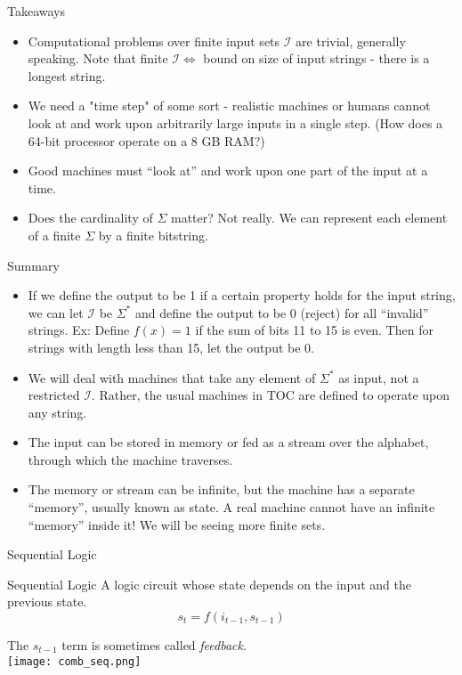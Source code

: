 \documentclass{beamer}
\begin{document}
\begin{frame}{Takeaways}
\begin{itemize}
    \item Computational problems over finite input sets \(\mathcal{I}\) are trivial, generally speaking. Note that finite \(\mathcal{I} \Leftrightarrow\) bound on size of input strings - there is a longest string.
    \pause
    \item We need a "time step" of some sort - realistic machines or humans cannot look at and work upon arbitrarily large inputs in a single step. (How does a 64-bit processor operate on a 8 GB RAM?) \pause
    \item Good machines must ``look at'' and work upon one part of the input at a time. \pause
    \item Does the cardinality of \(\Sigma\) matter? Not really. We can represent each element of a finite \(\Sigma\) by a finite bitstring.
\end{itemize}
\end{frame}
\begin{frame}{Summary}
\begin{itemize}
    \item If we define the output to be 1 if a certain property holds for the input string, we can let \(\mathcal{I}\) be \(\Sigma^*\) and define the output to be 0 (reject) for all  ``invalid'' strings. Ex: Define \(f(x) = 1\) if the sum of bits 11 to 15 is even. Then for strings with length less than 15, let the output be 0.
    \item We will deal with machines that take any element of \(\Sigma^*\) as input, not a restricted \(\mathcal{I}\). Rather, the usual machines in TOC are defined to operate upon any string.
    \item The input can be stored in memory or fed as a stream over the alphabet, through which the machine traverses.
    \item The memory or stream can be infinite, but the machine has a separate ``memory'', usually known as state. A real machine cannot have an infinite ``memory'' inside it! We will be seeing more finite sets.
\end{itemize}
\end{frame}
\begin{frame}{Sequential Logic}
\begin{block}{Sequential Logic}
A logic circuit whose state depends on the input and the previous state. \[s_t = f(i_{t-1}, s_{t-1})\]
\end{block}
The \(s_{t-1}\) term is sometimes called \emph{feedback}.\\
\pause
\texttt{[image: comb\_seq.png]}
\end{frame}
\end{document}
